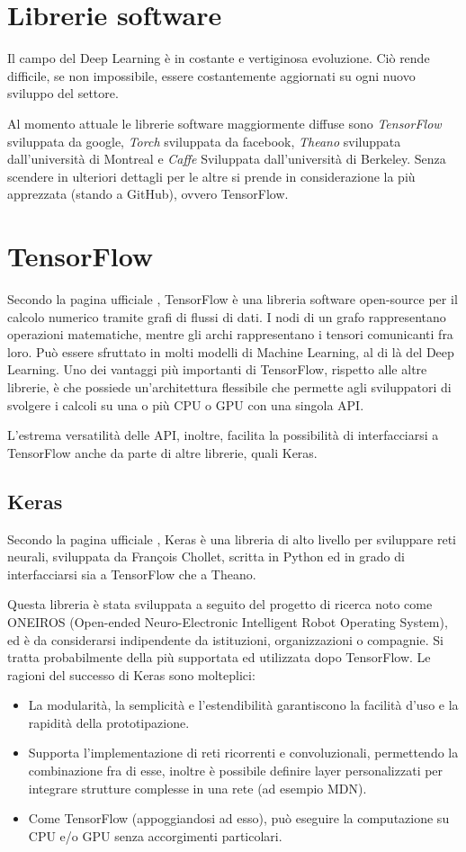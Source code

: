 \section{Librerie software}
Il campo del Deep Learning è in costante e vertiginosa evoluzione. Ciò rende difficile, se non impossibile, essere costantemente aggiornati su ogni nuovo sviluppo del settore.

Al momento attuale le librerie software maggiormente diffuse sono \textit{TensorFlow} sviluppata da google, \textit{Torch} sviluppata da facebook, \textit{Theano} sviluppata dall'università di Montreal e \textit{Caffe} Sviluppata dall'università di Berkeley. Senza scendere in ulteriori dettagli per le altre si prende in considerazione la più apprezzata (stando a GitHub), ovvero TensorFlow.
\section{TensorFlow} %
\label{sec:tensorflow}
Secondo la pagina ufficiale \cite{tensorflow}, TensorFlow è una libreria software open-source per il calcolo numerico tramite grafi di flussi di dati. I nodi di un grafo rappresentano operazioni matematiche, mentre gli archi rappresentano i tensori comunicanti fra loro. Può essere sfruttato in molti modelli di Machine Learning, al di là del Deep Learning. Uno dei vantaggi più importanti di TensorFlow, rispetto alle altre librerie, è che possiede un'architettura flessibile che permette agli sviluppatori di svolgere i calcoli su una o più CPU o GPU con una singola API.

L'estrema versatilità delle API, inoltre, facilita la possibilità di interfacciarsi a TensorFlow anche da parte di altre librerie, quali Keras.
\subsection{Keras}
Secondo la pagina ufficiale \cite{keras}, Keras è una libreria di alto livello per sviluppare reti neurali, sviluppata da Fran\c{c}ois Chollet, scritta in Python ed in grado di interfacciarsi sia a TensorFlow che a Theano.

Questa libreria è stata sviluppata a seguito del progetto di ricerca noto come ONEIROS (Open-ended Neuro-Electronic Intelligent Robot Operating System), ed è da considerarsi indipendente da istituzioni, organizzazioni o compagnie. Si tratta probabilmente della più supportata ed utilizzata dopo TensorFlow. Le ragioni del successo di Keras sono molteplici: 
\begin{itemize}
	\item La modularità, la semplicità e l'estendibilità garantiscono la facilità d'uso e la rapidità della prototipazione.
	\item Supporta l'implementazione di reti ricorrenti e convoluzionali, permettendo la combinazione fra di esse, inoltre è possibile definire layer personalizzati per integrare strutture complesse in una rete (ad esempio MDN).
	\item Come TensorFlow (appoggiandosi ad esso), può eseguire la computazione su CPU e/o GPU senza accorgimenti particolari.
\end{itemize}
